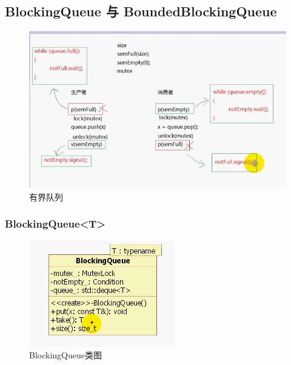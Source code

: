 \documentclass[UTF8,a4paper,8pt]{ctexbook}
\begin{document}
		\subsection{BlockingQueue 与 BoundedBlockingQueue}
			
				\begin{figure}[htbp]
					\centering
					\includegraphics[scale= 0.7]{figure/BoundedBlockingQueue.png}
					\caption{有界队列}
				\end{figure}
				
			\subsubsection{BlockingQueue<T>}
				\begin{figure}[htbp]
					\centering
					\includegraphics[scale= 0.6]{figure/BlockingQueue.png}
					\caption{BlockingQueue类图}
				\end{figure}
				
\end{document}
